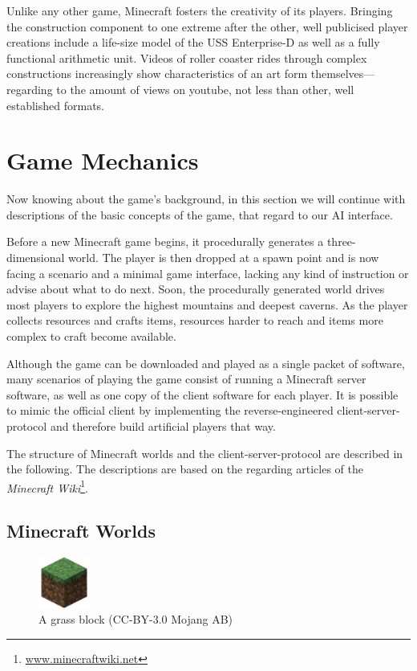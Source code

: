 Unlike any other game, Minecraft fosters the creativity of its players. Bringing the construction component to one extreme after the other, well publicised player creations include a life-size model of the USS Enterprise-D as well as a fully functional arithmetic unit. Videos of roller coaster rides through complex constructions increasingly show characteristics of an art form themselves---regarding to the amount of views on youtube, not less than other, well established formats.

    \section{Game Mechanics}
Now knowing about the game's background, in this section we will continue with descriptions of the basic concepts of the game, that regard to our AI interface. 

Before a new Minecraft game begins, it procedurally generates a three-dimensional world. The player is then dropped at a spawn point and is now facing a scenario and a minimal game interface, lacking any kind of instruction or advise about what to do next. Soon, the procedurally generated world drives most players to explore the highest mountains and deepest caverns. As the player collects resources and crafts items, resources harder to reach and items more complex to craft become available.~\cite{Duncan:2011:MBC:2207096.2207097}

Although the game can be downloaded and played as a single packet of software, many scenarios of playing the game consist of running a Minecraft server software, as well as one copy of the client software for each player. It is possible to mimic the official client by implementing the reverse-engineered client-server-protocol and therefore build artificial players that way.

The structure of Minecraft worlds and the client-server-protocol are described in the following. The descriptions are based on the regarding articles of the \emph{Minecraft Wiki}\footnote{\url{www.minecraftwiki.net}}.

    \subsection{Minecraft Worlds}
    

\begin{figure}
  \begin{center}
    \includegraphics[width=0.15\textwidth]{graphics/block}
  \end{center}
  \caption{A grass block (CC-BY-3.0 Mojang AB) \cite{image_mob}}
  \label{mc_block}
\end{figure}

